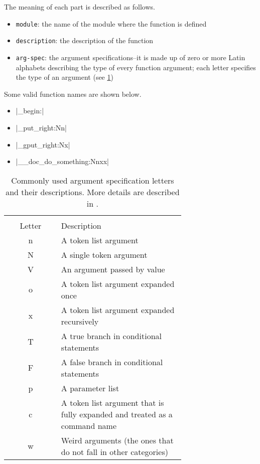 \documentclass{ltugboat}
\begin{document}
\vspace*{0.5\baselineskip}
\par\noindent
The meaning of each part is described as follows.
\begin{itemize}
\item \texttt{module}: the name of the module where the function is defined
\item \texttt{description}: the description of the function
\item \texttt{arg-spec}: the argument specifications--it is made up of zero or more Latin alphabets describing the type of every function argument; each letter specifies the type of an argument (see \cref{tbl:arg-spec-type})
\end{itemize}
Some valid function names are shown below.
\begin{itemize}
\item \inltex|\group_begin:|
\item \inltex|\tl_put_right:Nn|
\item \inltex|\tl_gput_right:Nx|
\item \inltex|\__doc_do_something:Nnxx|
\end{itemize}

\begin{table}[htpb]
\centering
\small
\setlength\extrarowheight{3pt}
\begin{tabular}{>{\ttfamily\centering}cm{0.7\linewidth}}
\toprule
\multicolumn{1}{c}{\makecell{\texttt{arg-spec}\\ Letter}} & Description\\ \midrule
n & A token list argument\\
N & A single token argument\\
V & An argument passed by value\\
o & A token list argument expanded once\\
x & A token list argument expanded recursively\\
T & A true branch in conditional statements\\
F & A false branch in conditional statements\\
p & A parameter list\\
c & A token list argument that is fully expanded and treated as a command name\\
w & Weird arguments (the ones that do not fall in other categories)\\
\bottomrule
\end{tabular}
\caption{Commonly used argument specification letters and their descriptions. More details are described in .}
\label{tbl:arg-spec-type}
\end{table}
\end{document}
